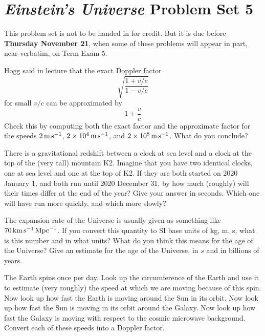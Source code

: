 \documentclass[12pt, letterpaper]{article}
\begin{document}
\section*{\textsl{Einstein's Universe} Problem Set 5}

This problem set is not to be handed in for credit. But it is due
before \textbf{Thursday November 21}, when some of these problems
will appear in part, near-verbatim, on Term Exam 5.

\begin{problem}
Hogg said in lecture that the exact Doppler factor
\begin{equation}
\sqrt{\frac{1 + {v/c}}{1 - {v/c}}}
\end{equation}
for small $v/c$ can be approximated by
\begin{equation}
1 + \frac{v}{c}
\end{equation}
Check this by computing both the exact factor and the approximate factor for
the speeds $2\,\mathrm{m}\,\mathrm{s}^{-1}$, $2\times10^4\,\mathrm{m}\,\mathrm{s}^{-1}$, and $2\times 10^8\,\mathrm{m}\,\mathrm{s}^{-1}$.
What do you conclude?
\end{problem}

\begin{problem}
There is a gravitational redshift between a clock at sea level and a clock at the
top of the (very tall) mountain K2.
Imagine that you have two identical clocks, one at sea level and one at the top of K2.
If they are both started on 2020 January 1,
and both run until 2020 December 31, by how much (roughly) will their times differ
at the end of the year? Give your answer in seconds.
Which one will have run more quickly, and which more slowly?
\end{problem}

\begin{problem}
The expansion rate of the Universe is usually given as something like $70\,\mathrm{km}\,\mathrm{s}^{-1}\,\mathrm{Mpc}^{-1}$.
If you convert this quantity to SI base units of kg, m, s, what is this number and in what units?
What do you think this means for the age of the Universe?
Give an estimate for the age of the Universe, in $s$ and in billions of years.
\end{problem}

\begin{problem}
The Earth spins once per day. Look up the circumference of the Earth and use it to estimate
(very roughly) the speed at which we are moving because of this spin.
Now look up how fast the Earth is moving around the Sun in its orbit.
Now look up how fast the Sun is moving in its orbit around the Galaxy.
Now look up how fast the Galaxy is moving with respect to the cosmic microwave background.
Convert each of these speeds into a Doppler factor.
\end{problem}
\end{document}

